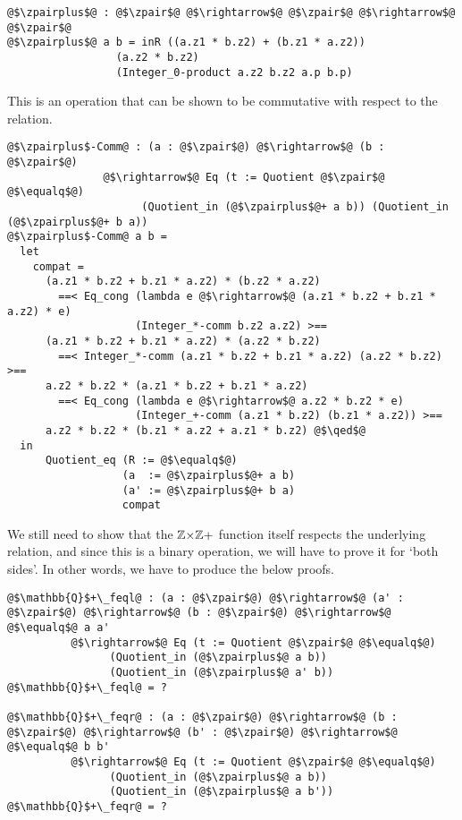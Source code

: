 \documentclass[12pt,twoside,maitrise]{dms}
\theoremstyle{definition}
\numberwithin{equation}{section}
\numberwithin{table}{chapter}
\numberwithin{figure}{chapter}
\renewcommand\qed{\blacksquare}
\begin{document}
\begin{verbatim}
@$\zpairplus$@ : @$\zpair$@ @$\rightarrow$@ @$\zpair$@ @$\rightarrow$@ @$\zpair$@
@$\zpairplus$@ a b = inR ((a.z1 * b.z2) + (b.z1 * a.z2))
                 (a.z2 * b.z2)
                 (Integer_0-product a.z2 b.z2 a.p b.p)
\end{verbatim}

This is an operation that can be shown to be commutative with respect to the
relation.

\begin{verbatim}
@$\zpairplus$-Comm@ : (a : @$\zpair$@) @$\rightarrow$@ (b : @$\zpair$@)
               @$\rightarrow$@ Eq (t := Quotient @$\zpair$@ @$\equalq$@)
                     (Quotient_in (@$\zpairplus$@+ a b)) (Quotient_in (@$\zpairplus$@+ b a))
@$\zpairplus$-Comm@ a b =
  let
    compat =
      (a.z1 * b.z2 + b.z1 * a.z2) * (b.z2 * a.z2)
        ==< Eq_cong (lambda e @$\rightarrow$@ (a.z1 * b.z2 + b.z1 * a.z2) * e)
                    (Integer_*-comm b.z2 a.z2) >==
      (a.z1 * b.z2 + b.z1 * a.z2) * (a.z2 * b.z2)
        ==< Integer_*-comm (a.z1 * b.z2 + b.z1 * a.z2) (a.z2 * b.z2) >==
      a.z2 * b.z2 * (a.z1 * b.z2 + b.z1 * a.z2)
        ==< Eq_cong (lambda e @$\rightarrow$@ a.z2 * b.z2 * e)
                    (Integer_+-comm (a.z1 * b.z2) (b.z1 * a.z2)) >==
      a.z2 * b.z2 * (b.z1 * a.z2 + a.z1 * b.z2) @$\qed$@
  in
      Quotient_eq (R := @$\equalq$@)
                  (a  := @$\zpairplus$@+ a b)
                  (a' := @$\zpairplus$@+ b a)
                  compat
\end{verbatim}

We still need to show that the $\mathbb{Z}{\times}\mathbb{Z}+$ function itself respects the
underlying relation, and since this is a binary operation, we will have to prove
it for `both sides'. In other words, we have to produce the below proofs.

\begin{verbatim}
@$\mathbb{Q}$+\_feql@ : (a : @$\zpair$@) @$\rightarrow$@ (a' : @$\zpair$@) @$\rightarrow$@ (b : @$\zpair$@) @$\rightarrow$@ @$\equalq$@ a a'
          @$\rightarrow$@ Eq (t := Quotient @$\zpair$@ @$\equalq$@)
                (Quotient_in (@$\zpairplus$@ a b))
                (Quotient_in (@$\zpairplus$@ a' b))
@$\mathbb{Q}$+\_feql@ = ?

@$\mathbb{Q}$+\_feqr@ : (a : @$\zpair$@) @$\rightarrow$@ (b : @$\zpair$@) @$\rightarrow$@ (b' : @$\zpair$@) @$\rightarrow$@ @$\equalq$@ b b'
          @$\rightarrow$@ Eq (t := Quotient @$\zpair$@ @$\equalq$@)
                (Quotient_in (@$\zpairplus$@ a b))
                (Quotient_in (@$\zpairplus$@ a b'))
@$\mathbb{Q}$+\_feqr@ = ?
\end{verbatim}
\end{document}
